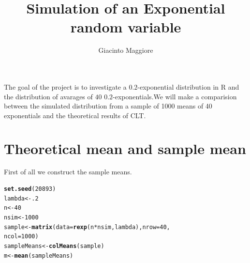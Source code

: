\documentclass[10pt]{article}\usepackage[]{graphicx}\usepackage[]{color}
\makeatletter
\newcommand{\hlnum}[1]{\textcolor[rgb]{0.686,0.059,0.569}{#1}}%
\newcommand{\hlopt}[1]{\textcolor[rgb]{0,0,0}{#1}}%
\newcommand{\hlstd}[1]{\textcolor[rgb]{0.345,0.345,0.345}{#1}}%
\newcommand{\hlkwb}[1]{\textcolor[rgb]{0.69,0.353,0.396}{#1}}%
\newcommand{\hlkwc}[1]{\textcolor[rgb]{0.333,0.667,0.333}{#1}}%
\newcommand{\hlkwd}[1]{\textcolor[rgb]{0.737,0.353,0.396}{\textbf{#1}}}%
\newenvironment{kframe}{%
 \def\at@end@of@kframe{}%
 \ifinner\ifhmode%
  \def\at@end@of@kframe{\end{minipage}}%
  \begin{minipage}{\columnwidth}%
 \fi\fi%
 \def\FrameCommand##1{\hskip\@totalleftmargin \hskip-\fboxsep
 \colorbox{shadecolor}{##1}\hskip-\fboxsep
     \hskip-\linewidth \hskip-\@totalleftmargin \hskip\columnwidth}%
 \MakeFramed {\advance\hsize-\width
   \@totalleftmargin\z@ \linewidth\hsize
   \@setminipage}}%
 {\par\unskip\endMakeFramed%
 \at@end@of@kframe}
\newenvironment{knitrout}{}{} %
\makeatother
\begin{document}
\author{Giacinto Maggiore}
\title{Simulation of an Exponential random variable}
\maketitle




The goal of the project is to investigate a  $0.2$-exponential distribution in R and the distribution of avarages of $40$ $0.2$-exponentials.We will make  a comparision between the simulated distribution from a sample of 1000 means of 40 exponentials and the theoretical results of CLT.

\section{Theoretical mean  and sample mean}
First of all we construct the sample means.

\begin{knitrout}
\color{fgcolor}\begin{kframe}
\begin{alltt}
\hlkwd{set.seed}\hlstd{(}\hlnum{20893}\hlstd{)}
\hlstd{lambda}\hlkwb{<-}\hlnum{.2}
\hlstd{n}\hlkwb{<-}\hlnum{40}
\hlstd{nsim}\hlkwb{<-}\hlnum{1000}
\hlstd{sample}\hlkwb{<-}\hlkwd{matrix}\hlstd{(}\hlkwc{data} \hlstd{=} \hlkwd{rexp}\hlstd{(n}\hlopt{*}\hlstd{nsim,lambda),}\hlkwc{nrow} \hlstd{=} \hlnum{40}\hlstd{,}
               \hlkwc{ncol} \hlstd{=} \hlnum{1000}\hlstd{)}
\hlstd{sampleMeans}\hlkwb{<-}\hlkwd{colMeans}\hlstd{(sample)}
\hlstd{m}\hlkwb{<-}\hlkwd{mean}\hlstd{(sampleMeans)}
\end{alltt}
\end{kframe}
\end{knitrout}
\end{document}
